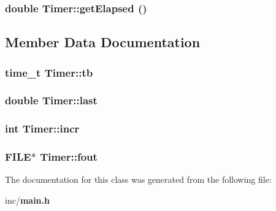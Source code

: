 \subsubsection{\setlength{\rightskip}{0pt plus 5cm}double Timer::getElapsed ()\hspace{0.3cm}{\tt  [inline]}}\label{classTimer_6d22efbd1f3ae9a3dd975dcfb033db66}




\subsection{Member Data Documentation}
\subsubsection{\setlength{\rightskip}{0pt plus 5cm}time\_\-t {\bf Timer::tb}\hspace{0.3cm}{\tt  [private]}}\label{classTimer_3b0d6c90e75035d605965c8117bcd4f8}


\subsubsection{\setlength{\rightskip}{0pt plus 5cm}double {\bf Timer::last}\hspace{0.3cm}{\tt  [private]}}\label{classTimer_348f0b583fa3b3d5f720e826d07d65fe}


\subsubsection{\setlength{\rightskip}{0pt plus 5cm}int {\bf Timer::incr}\hspace{0.3cm}{\tt  [private]}}\label{classTimer_4ae63194f3b00f8295e27e53f9ce883c}


\subsubsection{\setlength{\rightskip}{0pt plus 5cm}FILE$\ast$ {\bf Timer::fout}\hspace{0.3cm}{\tt  [private]}}\label{classTimer_79206658889015a54bd4495110f0cc70}




The documentation for this class was generated from the following file:\begin{CompactItemize}
\item 
inc/{\bf main.h}\end{CompactItemize}
